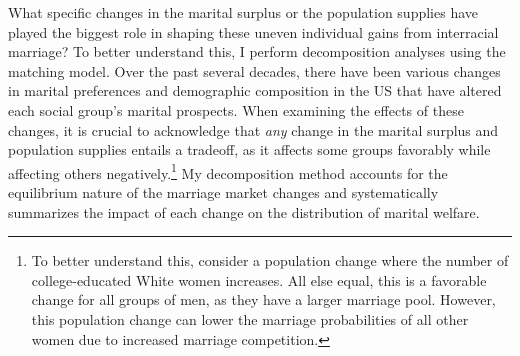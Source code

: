 What specific changes in the marital surplus or the population supplies have played the biggest role in shaping these uneven individual gains from interracial marriage? To better understand this, I perform decomposition analyses using the matching model. Over the past several decades, there have been various changes in marital preferences and demographic composition in the US that have altered each social group's marital prospects. When examining the effects of these changes, it is crucial to acknowledge that \textit{any} change in the marital surplus and population supplies entails a tradeoff, as it affects some groups favorably while affecting others negatively.\footnote{To better understand this, consider a population change where the number of college-educated White women increases. All else equal, this is a favorable change for all groups of men, as they have a larger marriage pool. However, this population change can lower the marriage probabilities of all other women due to increased marriage competition.} My decomposition method accounts for the equilibrium nature of the marriage market changes and systematically summarizes the impact of each change on the distribution of marital welfare. 



